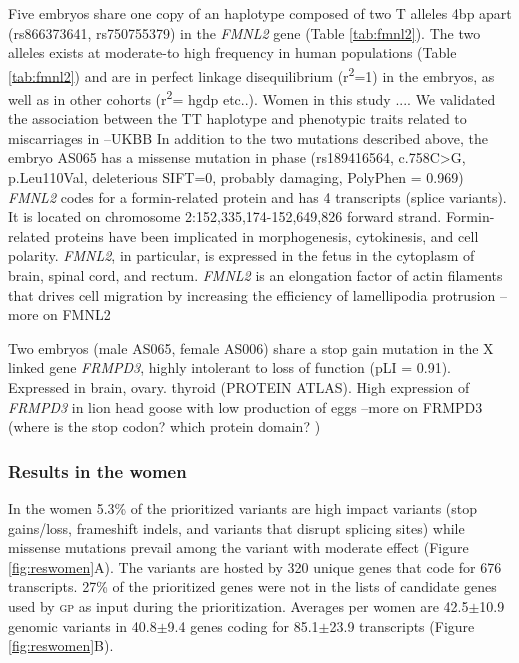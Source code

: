 \documentclass[fleqn,10pt]{wlscirep}
\newcommand{\gp}[]{\textsc{gp }}
\begin{document}
Five embryos share one copy of an haplotype composed of two T alleles 4bp apart (rs866373641, rs750755379) in the \textit{FMNL2} gene (Table \ref{tab:fmnl2}). The two alleles exists at moderate-to high frequency in human populations (Table \ref{tab:fmnl2}) and are in perfect linkage disequilibrium (r\textsuperscript{2}=1) in the embryos, as well as in other cohorts (r\textsuperscript{2}= hgdp etc..). Women in this study .... 
We validated the association between the TT haplotype and phenotypic traits related to miscarriages in --UKBB 
In addition to the two mutations described above, the embryo AS065 has a missense mutation in phase (rs189416564, c.758C>G, p.Leu110Val, deleterious SIFT=0, probably damaging, PolyPhen = 0.969) 
\textit{FMNL2} codes for a formin-related protein and has 4 transcripts (splice variants). It is located on chromosome 2:152,335,174-152,649,826 forward strand. Formin-related proteins have been implicated in morphogenesis, cytokinesis, and cell polarity. \textit{FMNL2}, in particular, is expressed in the fetus in the cytoplasm of brain, spinal cord, and rectum\cite{lizio2015gateways}. \textit{FMNL2} is an elongation factor of actin filaments that drives cell migration by increasing the efficiency of lamellipodia protrusion \cite{block2012fmnl2} --more on FMNL2

Two embryos (male AS065, female AS006) share a stop gain mutation in the X linked gene \textit{FRMPD3}, highly intolerant to loss of function (pLI = 0.91). Expressed in brain, ovary. thyroid (PROTEIN ATLAS). High expression of \textit{FRMPD3} in lion head goose with low production of eggs \cite{zhao2020genome} --more on FRMPD3 (where is the stop codon? which protein domain? )


\subsubsection*{Results in the women} 
In the women 5.3\% of the prioritized variants are  high impact variants (stop gains/loss, frameshift indels, and variants that disrupt splicing sites) while missense mutations prevail among the variant with moderate effect (Figure \ref{fig:reswomen}A). The variants are hosted by 320 unique genes that code for 676 transcripts. 27\% of the prioritized genes were not in the lists of candidate genes used by \gp as input during the prioritization. Averages per women  are 42.5$\pm$10.9 genomic variants in 40.8$\pm$9.4 genes coding for 85.1$\pm$23.9 transcripts (Figure \ref{fig:reswomen}B). 
\noindent
\end{document}
